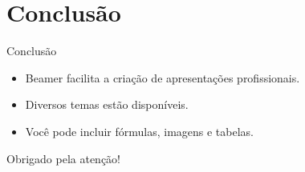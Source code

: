 \documentclass[aspectratio=169]{beamer}
\begin{document}
\section{Conclusão}
\begin{frame}{Conclusão}
\begin{itemize}
\item Beamer facilita a criação de apresentações profissionais.
\item Diversos temas estão disponíveis.
\item Você pode incluir fórmulas, imagens e tabelas.
\end{itemize}
\end{frame}

\begin{frame}
\centering
\Huge Obrigado pela atenção!
\end{frame}
\end{document}
